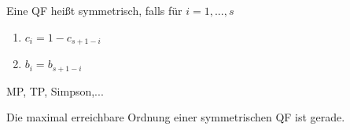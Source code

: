 \begin{comment}
Zu vergebenen paarweise verschiedenen Knoten $c_1, ..., c_s$ lässt sich aus (*) für $p=s$ ein lineares Gleichungssystem für die Gewichte $b_1, ..., b_s$ aufstellen.\\

$$
\underbrace{\left[ \begin{array}{rrrr}
1 & 1 & ... & 1 \\
c_1 & c_2 & ... & c_s \\
... & ... & ... & ... \\
c_1^{s-1} & c_2^{s-1} & ... & c_s^{s-1} \\
\end{array}\right]}_{= V}
*
\left[ \begin{array}{r}
b_1 \\
b_2 \\
... \\
b_s \\
\end{array}\right] 
= 
\left[ \begin{array}{r}
1 \\
1/2 \\
... \\
1/s \\
\end{array}\right] 
$$
Falls die Vandermonde-Matrix V invertierbar ist, so lassen sich die Gewichte $b_1, ..., b_s$ bestimmen, sodass die QF $(b_i, c_i)_{i = 1}^{s}$ mindestens Ordnung $s$ hat.
\end{comment}

\begin{definition}
Eine QF heißt symmetrisch, falls für $i = 1,...,s$
\begin{enumerate}
  \item $c_i = 1 - c_{s+1-i}$
  \item $b_i = b_{s+1-i}$
\end{enumerate}
\end{definition}

\begin{example}
MP, TP, Simpson,...
\end{example}

\begin{theorem}
Die maximal erreichbare Ordnung einer symmetrischen QF ist gerade.
\end{theorem}

